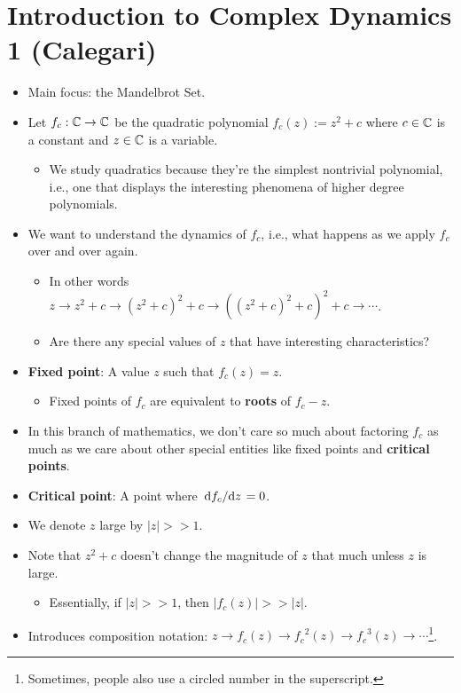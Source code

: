 \documentclass[../main.tex]{subfiles}
\begin{document}
\section{Introduction to Complex Dynamics 1 (Calegari)}
\begin{itemize}
    \item Main focus: the Mandelbrot Set.
    \item Let $f_c:\mathbb{C}\to\mathbb{C}$ be the quadratic polynomial $f_c(z):=z^2+c$ where $c\in\mathbb{C}$ is a constant and $z\in\mathbb{C}$ is a variable.
    \begin{itemize}
        \item We study quadratics because they're the simplest nontrivial polynomial, i.e., one that displays the interesting phenomena of higher degree polynomials.
    \end{itemize}
    \item We want to understand the dynamics of $f_c$, i.e., what happens as we apply $f_c$ over and over again.
    \begin{itemize}
        \item In other words $z\to z^2+c\to (z^2+c)^2+c\to ((z^2+c)^2+c)^2+c\to\cdots$.
        \item Are there any special values of $z$ that have interesting characteristics?
    \end{itemize}
    \item \textbf{Fixed point}: A value $z$ such that $f_c(z)=z$.
    \begin{itemize}
        \item Fixed points of $f_c$ are equivalent to \textbf{roots} of $f_c-z$.
    \end{itemize}
    \item In this branch of mathematics, we don't care so much about factoring $f_c$ as much as we care about other special entities like fixed points and \textbf{critical points}.
    \item \textbf{Critical point}: A point where $\dv*{f_c}{z}=0$.
    \item We denote $z$ large by $|z|>>1$.
    \item Note that $z^2+c$ doesn't change the magnitude of $z$ that much unless $z$ is large.
    \begin{itemize}
        \item Essentially, if $|z|>>1$, then $|f_c(z)|>>|z|$.
    \end{itemize}
    \item Introduces composition notation: $z\to f_c(z)\to {f_c}^2(z)\to {f_c}^3(z)\to\cdots$\footnote{Sometimes, people also use a circled number in the superscript.}.

\end{itemize}
\end{document}

